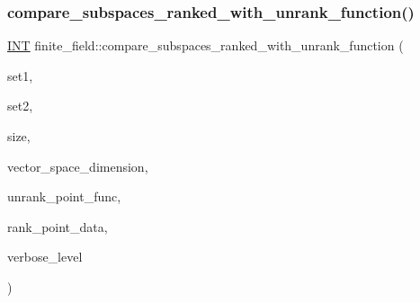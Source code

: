 \mbox{\label{classfinite__field_a081fbd0558d32f8258e086c62f6ca1c5}} 
\subsubsection{\texorpdfstring{compare\+\_\+subspaces\+\_\+ranked\+\_\+with\+\_\+unrank\+\_\+function()}{compare\_subspaces\_ranked\_with\_unrank\_function()}}
{\footnotesize\ttfamily \mbox{\hyperlink{galois_8h_a09fddde158a3a20bd2dcadb609de11dc}{I\+NT}} finite\+\_\+field\+::compare\+\_\+subspaces\+\_\+ranked\+\_\+with\+\_\+unrank\+\_\+function (\begin{DoxyParamCaption}\item[{\mbox{\hyperlink{galois_8h_a09fddde158a3a20bd2dcadb609de11dc}{I\+NT}} $\ast$}]{set1,  }\item[{\mbox{\hyperlink{galois_8h_a09fddde158a3a20bd2dcadb609de11dc}{I\+NT}} $\ast$}]{set2,  }\item[{\mbox{\hyperlink{galois_8h_a09fddde158a3a20bd2dcadb609de11dc}{I\+NT}}}]{size,  }\item[{\mbox{\hyperlink{galois_8h_a09fddde158a3a20bd2dcadb609de11dc}{I\+NT}}}]{vector\+\_\+space\+\_\+dimension,  }\item[{void($\ast$)(\mbox{\hyperlink{galois_8h_a09fddde158a3a20bd2dcadb609de11dc}{I\+NT}} $\ast$\mbox{\hyperlink{simeon_8_c_aeb3f3030944801b163bc3b829a7f6710}{v}}, \mbox{\hyperlink{galois_8h_a09fddde158a3a20bd2dcadb609de11dc}{I\+NT}} rk, void $\ast$data)}]{unrank\+\_\+point\+\_\+func,  }\item[{void $\ast$}]{rank\+\_\+point\+\_\+data,  }\item[{\mbox{\hyperlink{galois_8h_a09fddde158a3a20bd2dcadb609de11dc}{I\+NT}}}]{verbose\+\_\+level }\end{DoxyParamCaption})}

\mbox{\label{classfinite__field_a61c730d58251ae87102c16137053578f}} 
